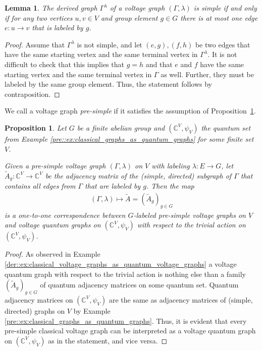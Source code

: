 \documentclass{amsart}
\newcommand{\C}{\mathbb{C}}
\newtheorem{proposition}[thm]{Proposition}
\newtheorem{lemma}[thm]{Lemma}
\theoremstyle{definition}
\theoremstyle{definition}
\begin{document}
\begin{lemma}
    \label{der::lemma:presimple_voltage_graph}
    The derived graph $\Gamma^\lambda$ of a voltage graph $(\Gamma, \lambda)$ is simple if and only if for any two vertices $u, v \in V$ and group element $g \in G$ there is at most one edge $e: u \to v$ that is labeled by $g$.
\end{lemma}

\begin{proof}
    Assume that $\Gamma^\lambda$ is not simple, and let $(e,g), (f,h)$ be two edges that have the same starting vertex and the same terminal vertex in $\Gamma^\lambda$. It is not difficult to check that this implies that $g=h$ and that $e$ and $f$ have the same starting vertex and the same terminal vertex in $\Gamma$ as well. Further, they must be labeled by the same group element. Thus, 
    the statement follows by contraposition.
\end{proof}

We call a voltage graph \emph{pre-simple} if it satisfies the assumption of Proposition~\ref{der::lemma:presimple_voltage_graph}.
 
\begin{proposition}
    \label{der::prop:classical_voltage_graphs_as_quantum_voltage_graphs}
    Let $G$ be a finite abelian group and $(\C^V, \psi_V)$ the quantum set from Example \ref{pre::ex:classical_graphs_as_quantum_graphs} for some finite set $V$.

    Given a pre-simple voltage graph $(\Gamma, \lambda)$ on $V$ with labeling $\lambda:E \to G$, let $\tilde{A}_g: \C^V \to \C^V$ be the adjacency matrix of the (simple, directed) subgraph of $\Gamma$ that contains all edges from $\Gamma$ that are labeled by $g$. Then the map
    \begin{align*}
        (\Gamma, \lambda) \mapsto \tilde{A} = (\tilde{A}_{g})_{g \in G}
    \end{align*}
    is a one-to-one correspondence between $G$-labeled pre-simple voltage graphs on $V$ and voltage quantum graphs on $(\C^V, \psi_V)$ with respect to the trivial action on $(\C^V, \psi_V)$.
\end{proposition}

\begin{proof}
    As observed in Example \ref{der::ex:classical_voltage_graphs_as_quantum_voltage_graphs} a voltage quantum graph with respect to the trivial action is nothing else than a family $(\tilde{A}_g)_{g \in G}$ of quantum adjacency matrices on some quantum set. Quantum adjacency matrices on $(\C^V, \psi_V)$ are the same as adjacency matrices of (simple, directed) graphs on $V$ by Example \ref{pre::ex:classical_graphs_as_quantum_graphs}. Thus, it is evident that every pre-simple classical voltage graph can be interpreted as a voltage quantum graph on $(\C^V, \psi_V)$ as in the statement, and vice versa.
\end{proof}
\end{document}
